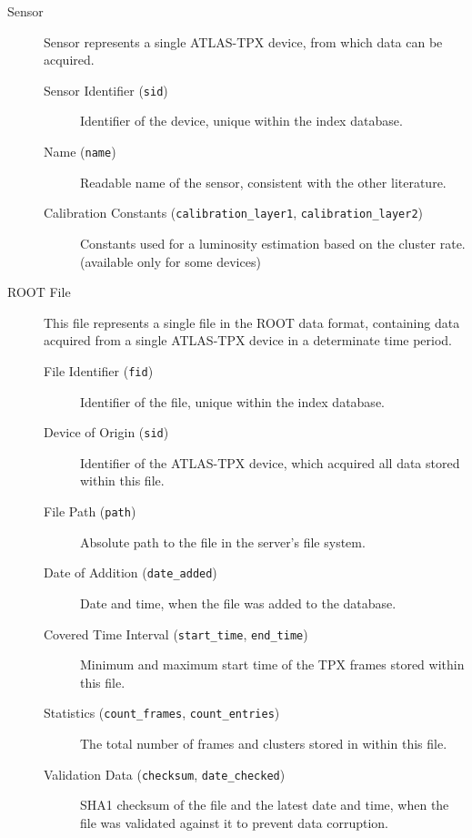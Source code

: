 \label{db:definition}
\begin{description}
	\item[Sensor]
	Sensor represents a single ATLAS-TPX device, from which data can be acquired.

	\begin{description}
		\item[Sensor Identifier (\texttt{sid})]
		Identifier of the device, unique within the index database.

		\item[Name (\texttt{name})]
		Readable name of the sensor, consistent with the other literature.

		\item[Calibration Constants (\texttt{calibration\_layer1}, \texttt{calibration\_layer2})]
		Constants used for a luminosity estimation based on the cluster rate. \cite{MeasuringRadiation} (available only for some devices)
	\end{description}

	\item[ROOT File]
	This file represents a single file in the ROOT data format, containing data acquired from a single ATLAS-TPX device in a determinate time period.

	\begin{description}
		\item[File Identifier (\texttt{fid})] 
		Identifier of the file, unique within the index database.

		\item[Device of Origin (\texttt{sid})]
		Identifier of the ATLAS-TPX device, which acquired all data stored within this file.

		\item[File Path (\texttt{path})] 
		Absolute path to the file in the server's file system.

		\item[Date of Addition (\texttt{date\_added})]
		Date and time, when the file was added to the database.

		\item[Covered Time Interval (\texttt{start\_time}, \texttt{end\_time})]
		Minimum and maximum start time of the TPX frames stored within this file.

		\item[Statistics (\texttt{count\_frames}, \texttt{count\_entries})]
		The total number of frames and clusters stored in within this file.

		\item[Validation Data (\texttt{checksum}, \texttt{date\_checked})]
		SHA1 checksum of the file and the latest date and time, when the file was validated against it to prevent data corruption.
	\end{description}


\end{description}

